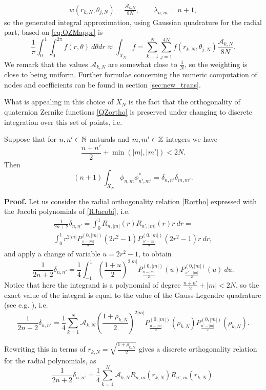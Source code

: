 \begin{gather}
	w(r_{k,N},\theta_{j,N}) = \frac{\mathcal{A}_{k,N}}{8N},\qquad \lambda_{n,m} = n+1,
	\label{weight}
\end{gather}
so the generated integral approximation, using Gaussian quadrature for the radial part, based on \eqref{eq:QZMappr} is
\[
	\frac{1}{\pi} \int_{0}^1 \int_0^{2\pi} f(r,\theta)\ d\theta dr \approx \int_{X_N} f = \sum_{k=1}^{N} \sum_{j=1}^{4N} f(r_{k,N},\theta_{j,N}) \frac{\mathcal{A}_{k,N}}{8N}.
\]
We remark that the values $\mathcal{A}_{k,N}$ are somewhat close to $\frac{1}{N}$, so the weighting is close to being uniform. Further formulae concerning the numeric computation of nodes and coefficients can be found in section \ref{sec:new_trans}.

What is appealing in this choice of $X_N$ is the fact that the orthogonality of quaternion Zernike functions \eqref{QZortho} is preserved under changing to  discrete integration over this set of points, i.e.
\begin{theorem}\label{QZdisc-ortho}
Suppose that for $n,n' \in \mathbb{N}$ naturals and $m,m' \in \mathbb{Z}$ integers we have $$\frac{n+n'}{2}+\min(|m|,|m'|) < 2N.$$ Then
\[
	(n+1) \int_{X_N} \phi_{n,m} \phi^*_{n',m'} =\delta_{n,n'}\delta_{m,m'}.
\]
\end{theorem}
\noindent\textbf{Proof.}
Let us consider the radial orthogonality relation \eqref{Rortho} expressed with the Jacobi polynomials of \eqref{RJacobi}, i.e.
\[
\begin{gathered}
	\frac{1}{2n+2} \delta_{n,n'} = \int_0^1 R_{n,|m|}(r) R_{n',|m|}(r)r\ dr  = \\
	\int_0^1 r^{2|m|} P_{\frac{n - |m|}{2}}^{(0,|m|)}(2r^2-1) P_{\frac{n' - |m|}{2}}^{(0,|m|)}(2r^2-1) r\ dr,
\end{gathered}
\]
and apply a change of variable $u=2r^2-1$, to obtain
\[
	\frac{1}{2n+2} \delta_{n,n'} = \frac{1}{4} \int_{-1}^1 \left(\frac{1+u}{2}\right)^{2|m|} P_{\frac{n - |m|}{2}}^{(0,|m|)}(u) P_{\frac{n' - |m|}{2}}^{(0,|m|)}(u)\ du.
\]
Notice that here the integrand is a polynomial of degree $\frac{n+n'}{2}+|m| < 2N$, so the exact value of the integral is equal to the value of the Gauss-Legendre quadrature (see e.g. \cite{Szego}), i.e.
\[
	\frac{1}{2n+2} \delta_{n,n'} = \frac{1}{4} \sum_{k=1}^{N} \mathcal{A}_{k,N} \left(\frac{1+\rho_{k,N}}{2}\right)^{2|m|} P_{\frac{n - |m|}{2}}^{(0,|m|)}(\rho_{k,N}) P_{\frac{n' - |m|}{2}}^{(0,|m|)}(\rho_{k,N}).
\]

Rewriting this in terms of $r_{k,N} = \sqrt{\frac{1+\rho_{k,N}}{2}}$ gives a discrete orthogonality relation for the radial polynomials, as
\begin{equation}\label{Rdisc-ortho}
	\frac{1}{2n+2} \delta_{n,n'} = \frac{1}{4} \sum_{k=1}^{N} \mathcal{A}_{k,N} R_{n,m}(r_{k,N}) R_{n',m}(r_{k,N}).
\end{equation}


